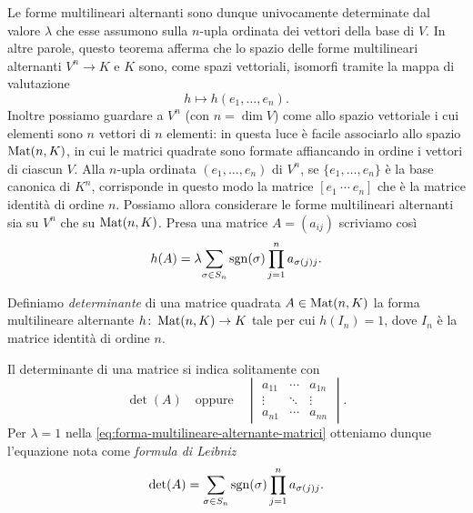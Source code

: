 Le forme multilineari alternanti sono dunque univocamente determinate dal valore $\lambda$ che esse assumono sulla $n$-upla ordinata dei vettori della base di $V$.
In altre parole, questo teorema afferma che lo spazio delle forme multilineari alternanti $V^n\to K$ e $K$ sono, come spazi vettoriali, isomorfi tramite la mappa di valutazione
\begin{equation}
	h\mapsto h(e_1,\dots,e_n).
\end{equation}
Inoltre possiamo guardare a $V^n$ (con $n=\dim V$) come allo spazio vettoriale i cui elementi sono $n$ vettori di $n$ elementi: in questa luce è facile associarlo allo spazio $\operatorname{Mat}(n,K)$, in cui le matrici quadrate sono formate affiancando in ordine i vettori di ciascun $V$.
Alla $n$-upla ordinata $(e_1,\dots,e_n)$ di $V^n$, se $\{e_1,\dots,e_n\}$ è la base canonica di $K^n$, corrisponde in questo modo la matrice $[e_1\ \cdots\ e_n]$ che è la matrice identità di ordine $n$.
Possiamo allora considerare le forme multilineari alternanti sia su $V^n$ che su $\operatorname{Mat}(n,K)$.
Presa una matrice $A=(a_{ij})$ scriviamo cos\`i
\begin{equation}
	h(A)=\lambda\!\sum_{\sigma\in S_n}\operatorname{sgn}(\sigma)\prod_{j=1}^na_{\sigma(j)j}.
	\label{eq:forma-multilineare-alternante-matrici}
\end{equation}
\begin{definizione} \label{d:determinante}
	Definiamo \emph{determinante} di una matrice quadrata $A\in\operatorname{Mat}(n,K)$ la forma multilineare alternante $h\colon\operatorname{Mat}(n,K)\to K$ tale per cui $h(I_n)=1$, dove $I_n$ è la matrice identità di ordine $n$.
\end{definizione}
Il determinante di una matrice si indica solitamente con
\begin{equation}
	\det(A)\quad\text{oppure}\quad
	\begin{vmatrix}
		a_{11}&\cdots&a_{1n}\\
		\vdots&\ddots&\vdots\\
		a_{n1}&\cdots&a_{nn}
	\end{vmatrix}.
\end{equation}
Per $\lambda=1$ nella \eqref{eq:forma-multilineare-alternante-matrici} otteniamo dunque l'equazione nota come \emph{formula di Leibniz}
\begin{equation}
	\det(A)=\sum_{\sigma\in S_n}\operatorname{sgn}(\sigma)\prod_{j=1}^na_{\sigma(j)j}.
	\label{eq:determinante-leibniz}
\end{equation}

